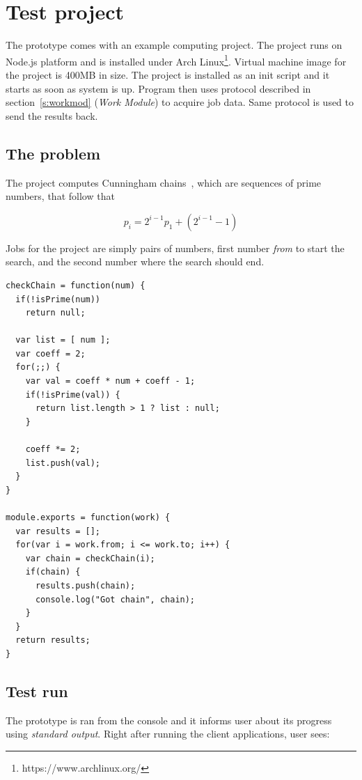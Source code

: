 \section{Test project}

The prototype comes with an example computing project. The project runs on Node.js platform and is installed under Arch Linux\footnote{https://www.archlinux.org/}. Virtual machine image for the project is 400MB in size. The project is installed as an init script and it starts as soon as system is up. Program then uses protocol described in section~\ref{s:workmod} (\emph{Work Module}) to acquire job data. Same protocol is used to send the results back.

\subsection{The problem}

The project computes Cunningham chains~\cite{andersen2005cunningham}, which are sequences of prime numbers, that follow that

\begin{equation}
p_i = 2^{i-1}p_1 + (2^{i-1}-1)
\end{equation}

Jobs for the project are simply pairs of numbers, first number \emph{from} to start the search, and the second number where the search should end.

\begin{lstlisting}[caption=Javascript code for searching Cunningham chains.]
checkChain = function(num) {
  if(!isPrime(num))
    return null;

  var list = [ num ];
  var coeff = 2;
  for(;;) {
    var val = coeff * num + coeff - 1;
    if(!isPrime(val)) {
      return list.length > 1 ? list : null;
    }

    coeff *= 2;
    list.push(val);
  }
}

module.exports = function(work) {
  var results = [];
  for(var i = work.from; i <= work.to; i++) {
    var chain = checkChain(i);
    if(chain) {
      results.push(chain);
      console.log("Got chain", chain);
    }
  }
  return results;
}
\end{lstlisting}

\subsection{Test run}

The prototype is ran from the console and it informs user about its progress using \emph{standard output}. Right after running the client applications, user sees:

